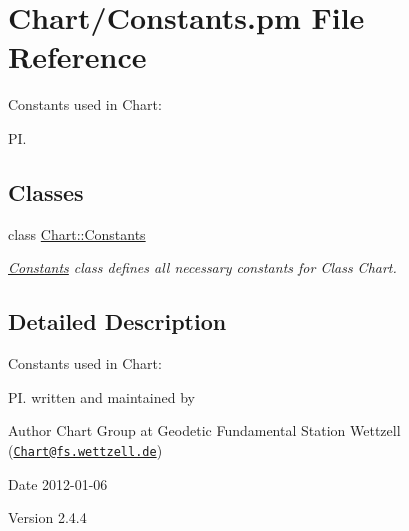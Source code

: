 \hypertarget{Constants_8pm}{
\section{Chart/Constants.pm File Reference}
\label{Constants_8pm}
}


Constants used in Chart:\par
 PI.  


\subsection*{Classes}
\begin{DoxyCompactItemize}
\item 
class \hyperlink{classChart_1_1Constants}{Chart::Constants}
\begin{DoxyCompactList}\small\item\em \hyperlink{classChart_1_1Constants}{Constants} class defines all necessary constants for Class Chart. \item\end{DoxyCompactList}\end{DoxyCompactItemize}


\subsection{Detailed Description}
Constants used in Chart:\par
 PI. written and maintained by \begin{DoxyAuthor}{Author}
Chart Group at Geodetic Fundamental Station Wettzell (\href{mailto:Chart@fs.wettzell.de}{\tt Chart@fs.wettzell.de}) 
\end{DoxyAuthor}
\begin{DoxyDate}{Date}
2012-\/01-\/06 
\end{DoxyDate}
\begin{DoxyVersion}{Version}
2.4.4 
\end{DoxyVersion}
